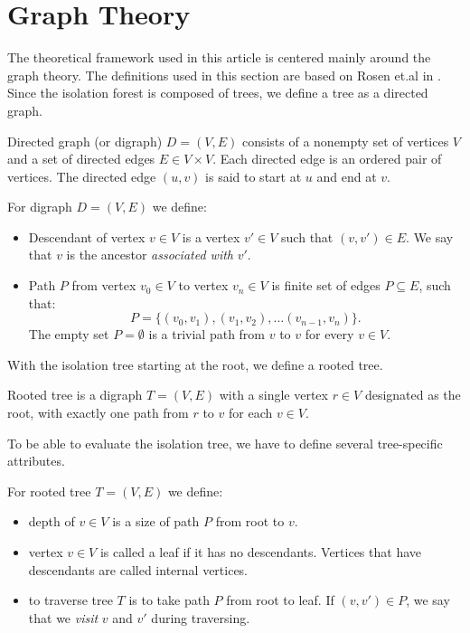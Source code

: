 \section{Graph Theory}
\label{sec:graph_theory}

The theoretical framework used in this article is centered mainly around the graph theory.
The definitions used in this section are based on Rosen et.al in \cite{rosen2012discrete}. Since the isolation forest is composed of trees, we define a tree as a directed graph.

\begin{definition}
Directed graph (or digraph) $D = (V, E)$ consists of a nonempty set of vertices $V$ and a set of directed edges $E \in V \times V$. Each directed edge is an ordered pair of vertices.
The directed edge $(u, v)$ is said to start at $u$ and end at $v$.
\end{definition}


\begin{definition}
For digraph $D = (V,E)$ we define:
\begin{itemize}
    \item Descendant of vertex $v \in V$ is a vertex $v' \in V$ such that $(v,v') \in E$. We say that $v$ is the ancestor \emph{associated with} $v'$.
    \item Path $P$ from vertex $v_0 \in V$ to vertex $v_n \in V$ is finite set of edges $P \subseteq E$, such that: $$P = \{(v_0, v_1),(v_1, v_2),\dots(v_{n-1}, v_n)\}.$$
      The empty set $P = \emptyset$ is a trivial path from $v$ to $v$ for every $v \in V$.
    
\end{itemize}
\end{definition}

With the isolation tree starting at the root, we define a rooted tree.

\begin{definition}
Rooted tree is a digraph $T = (V,E)$ with a single vertex $r \in V$ designated as the root, with exactly one path from $r$ to $v$ for each $v \in V$.
\end{definition}

To be able to evaluate the isolation tree, we have to define several tree-specific attributes.

\begin{definition}
For rooted tree $T = (V,E)$ we define:
\begin{itemize}
    \item depth of $v \in V$ is a size of path $P$ from root to $v$.
    \item vertex $v \in V$ is called a leaf if it has no descendants. Vertices that have descendants are called internal vertices.
    \item to traverse tree $T$ is to take path $P$ from root to leaf. If $(v,v') \in P$, we say that we \emph{visit} $v$ and $v'$ during traversing.
\end{itemize}
\end{definition}

